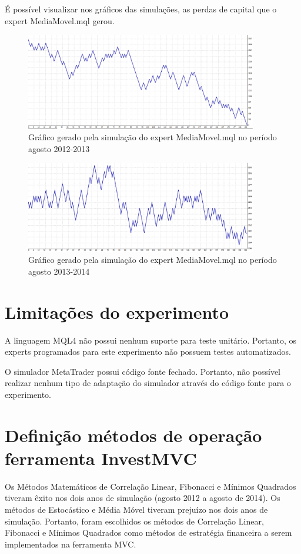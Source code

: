 É possível visualizar nos gráficos das simulações, as perdas de capital que o expert MediaMovel.mql gerou.

\begin{figure}[H]
\centering
\includegraphics[width=0.9\textwidth]{figuras/protocoloMedia3}
\caption{ Gráfico gerado pela simulação do expert MediaMovel.mql no período agosto 2012-2013} 
\label{protocoloMedia3}
\end{figure}

\begin{figure}[H]
\centering
\includegraphics[width=0.9\textwidth]{figuras/protocoloMedia4}
\caption{ Gráfico gerado pela simulação do expert MediaMovel.mql no período agosto 2013-2014} 
\label{protocoloMedia4}
\end{figure}

\section{Limitações do experimento}

A linguagem MQL4 não possui nenhum suporte para teste unitário. Portanto, os experts programados para este experimento não possuem testes automatizados. 

O simulador MetaTrader possui código fonte fechado. Portanto, não possível realizar nenhum tipo de adaptação do simulador através do código fonte para o experimento.

\section{Definição métodos de operação ferramenta InvestMVC}

Os Métodos Matemáticos de Correlação Linear, Fibonacci e Mínimos Quadrados tiveram êxito nos dois anos de simulação (agosto 2012 a agosto de 2014). Os métodos de Estocástico e Média Móvel tiveram prejuízo nos dois anos de simulação. Portanto, foram escolhidos os métodos de Correlação Linear, Fibonacci e Mínimos Quadrados como métodos de estratégia financeira a serem implementados na ferramenta MVC.
